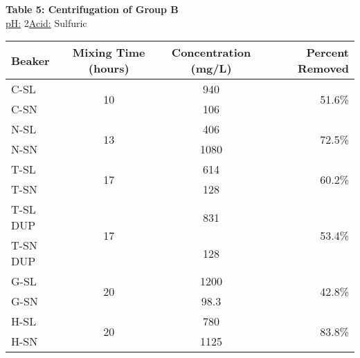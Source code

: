 \begin{center}
\begin{minipage}{.5\textwidth}
        \end{minipage}
        \newpage
        {\large{\bf Table 5: Centrifugation of Group B\\}}
        \vspace{2 mm}
        \underline{pH:} 2\hspace{5mm}\underline{Acid:} Sulfuric\\
        \vspace{2 mm}
        \begin{tabular}{|l c c r|}
            \hline
            \textbf{Beaker} & \textbf{Mixing Time (hours)} & \textbf{Concentration (mg/L)} & \textbf{Percent Removed} \\ \hline
            C-SL     & \multirow{2}{*}{10} & 940  & \multirow{2}{*}{51.6\%} \\
            C-SN     &  & 106  &  \\\hline
            N-SL     & \multirow{2}{*}{13} & 406  & \multirow{2}{*}{72.5\%} \\
            N-SN     &  & 1080 & \\\hline
            T-SL     & \multirow{2}{*}{17} & 614  & \multirow{2}{*}{60.2\%} \\
            T-SN     &  & 128  & \\\hline
            T-SL DUP & \multirow{2}{*}{17} & 831  & \multirow{2}{*}{53.4\%} \\
            T-SN DUP &  & 128  & \\\hline
            G-SL     & \multirow{2}{*}{20} & 1200 & \multirow{2}{*}{42.8\%} \\
            G-SN     &  & 98.3 & \\\hline
            H-SL     & \multirow{2}{*}{20} & 780  & \multirow{2}{*}{83.8\%} \\
            H-SN     &  & 1125 & \\\hline
        \end{tabular}
        \pgfplotsset{width=8cm}
        \begin{minipage}{.5\textwidth}

\end{minipage}
\end{center}
